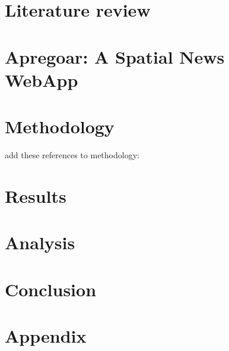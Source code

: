 \documentclass[11pt,usenames,dvipsnames]{article} %
\begin{document}
\newpage
\section{Literature review}  \label{sec:lit_review}





\newpage
\section{Apregoar: A Spatial News WebApp} \label{sec:proj_desc}


\newpage
\section{Methodology} \label{sec:methodology}

{\color{red}add these references to methodology:}


\newpage
\section{Results}
\newpage
\section{Analysis}

\newpage
\section{Conclusion}









\newpage
{\footnotesize
	
	 \label{sec:bibliography}
}

\newpage
\section*{Appendix}  \label{sec:appendices}
\begin{appendices}
	
\end{appendices}
\end{document}
